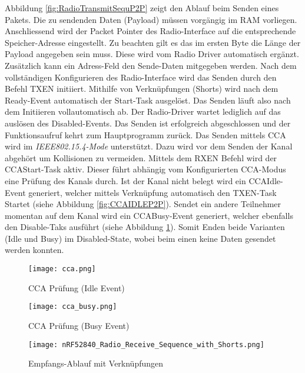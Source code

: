 Abbildung \ref{fig:RadioTransmitSequP2P} zeigt den Ablauf beim Senden eines Pakets. Die zu sendenden Daten (Payload) müssen vorgängig im RAM vorliegen. Anschliessend wird der Packet Pointer des Radio-Interface auf die entsprechende Speicher-Adresse eingestellt. Zu beachten gilt es das im ersten Byte die Länge der Payload angegeben sein muss. Diese wird vom Radio Driver automatisch ergänzt. Zusätzlich kann ein Adress-Feld den Sende-Daten mitgegeben werden. Nach dem vollständigen Konfigurieren des Radio-Interface wird das Senden durch den Befehl TXEN initiiert. Mithilfe von Verknüpfungen (Shorts) wird nach dem Ready-Event automatisch der Start-Task ausgelöst. Das Senden läuft also nach dem Initiieren vollautomatisch ab. Der Radio-Driver wartet lediglich auf das auslösen des Disabled-Events. Das Senden ist erfolgreich abgeschlossen und der Funktionsaufruf kehrt zum Hauptprogramm zurück. Das Senden mittels CCA wird im \textit{IEEE802.15.4-Mode} unterstützt. Dazu wird vor dem Senden der Kanal abgehört um Kollisionen zu vermeiden. Mittels dem RXEN Befehl wird der CCAStart-Task aktiv. Dieser führt abhängig vom Konfigurierten CCA-Modus eine Prüfung des Kanals durch. Ist der Kanal nicht belegt wird ein CCAIdle-Event generiert, welcher mittels Verknüpfung automatisch den TXEN-Task Startet (siehe Abbildung \ref{fig:CCAIDLEP2P}). Sendet ein andere Teilnehmer momentan auf dem Kanal wird ein CCABusy-Event generiert, welcher ebenfalls den Disable-Taks ausführt (siehe Abbildung \ref{fig:CCABUSYP2P}). Somit Enden beide Varianten (Idle und Busy) im Disabled-State, wobei beim einen keine Daten gesendet werden konnten. \cite{nordic_semi_nrf_infocenter_radio_transmit_sequence_2020}

\begin{figure}[!htbp]
	\begin{minipage}{0.49\textwidth}
		\centering
		\texttt{[image: cca.png]}
		\caption[Sende-Ablauf mit CCA Idle]{CCA Prüfung (Idle Event) \cite{nordic_semi_nrf_infocenter_radio_ieee_operation_2020}}
		\label{fig:CCAIDLEP2P}
	\end{minipage}
	\begin{minipage}{0.49\textwidth}
		\centering
		\texttt{[image: cca\_busy.png]}
		\caption[Sende-Ablauf mit CCA Busy]{CCA Prüfung (Busy Event) \cite{nordic_semi_nrf_infocenter_radio_ieee_operation_2020}}
		\label{fig:CCABUSYP2P}
	\end{minipage}
\end{figure}

\begin{figure} [H]
	\centering
	\texttt{[image: nRF52840\_Radio\_Receive\_Sequence\_with\_Shorts.png]}
	\caption{Empfangs-Ablauf mit Verknüpfungen \cite{nordic_semi_nrf_infocenter_radio_receive_sequence_2020}}
	\label{fig:RadioReceiveSequP2P}
\end{figure}

